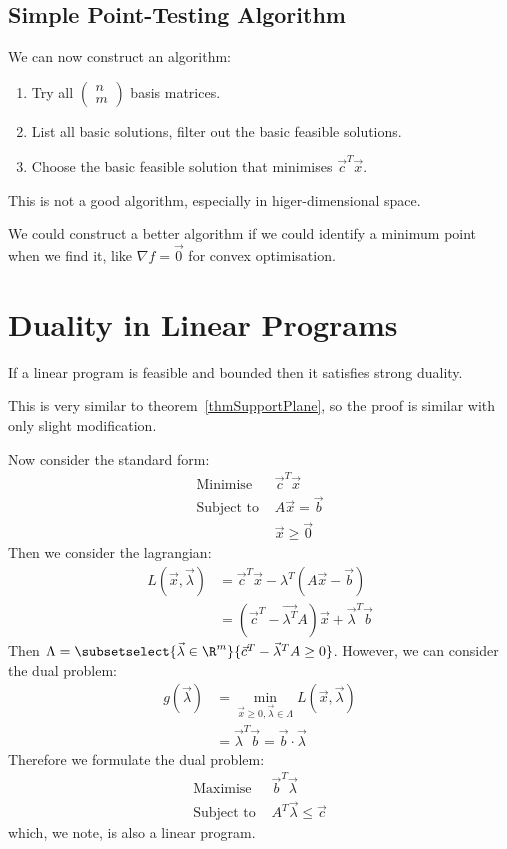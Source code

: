 \documentclass[../Main.tex]{subfiles}
\begin{document}
\subsection{Simple Point-Testing Algorithm}
We can now construct an algorithm:
\begin{enumerate}
    \item Try all $\begin{pmatrix} n \\ m \end{pmatrix}$ basis matrices.
    \item List all basic solutions, filter out the basic feasible solutions.
    \item Choose the basic feasible solution that minimises $\vec{c}^T \vec{x}$.
\end{enumerate}
\begin{remarks}
    \item This is not a good algorithm, especially in higer-dimensional space.
    \item We could construct a better algorithm if we could identify a minimum point when we find it, like $\nabla f = \vec{0}$ for convex optimisation.
\end{remarks}
\section{Duality in Linear Programs}
\begin{theorem}
    If a linear program is feasible and bounded then it satisfies strong duality.
\end{theorem}
\begin{remark}
    This is very similar to theorem~\ref{thmSupportPlane}, so the proof is similar with only slight modification.
\end{remark}
Now consider the standard form:
\begin{align*}
    \text{Minimise } &\vec{c}^T \vec{x} \\
    \text{Subject to } &A\vec{x} = \vec{b} \\
    &\vec{x} \geq \vec{0}
\end{align*}
Then we consider the lagrangian:
\begin{align*}
    L(\vec{x}, \vec{\lambda}) &= \vec{c}^T \vec{x} - \lambda^T (A\vec{x} - \vec{b}) \\
    &= (\vec{c}^T - \vec{\lambda^T} A)\vec{x} + \vec{\lambda}^T \vec{b}
\end{align*}
Then $\Lambda = \subsetselect{\vec{\lambda} \in \R^m}{\vec{c}^T - \vec{\lambda}^T A \geq 0}$. However, we can consider the dual problem:
\begin{align*}
    g(\vec{\lambda}) &= \min_{\vec{x} \geq 0, \vec{\lambda} \in \Lambda} L(\vec{x}, \vec{\lambda}) \\
    &= \vec{\lambda}^T \vec{b} = \vec{b} \cdot \vec{\lambda}
\end{align*}
Therefore we formulate the dual problem:
\begin{align*}
    \text{Maximise } &\vec{b}^T \vec{\lambda} \\
    \text{Subject to } &A^T \vec{\lambda} \leq \vec{c}
\end{align*}
which, we note, is also a linear program.
\end{document}
